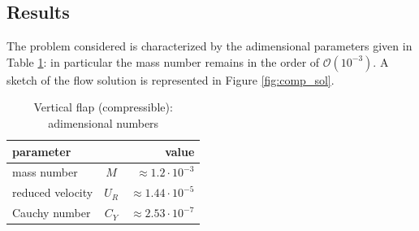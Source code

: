 \subsection{Results}

The problem considered is characterized by the adimensional parameters given in Table \ref{table:comp-adim}: in particular the mass number remains in the order of $\mathcal{O} \left(10^{-3}\right)$. A sketch of the flow solution is represented in Figure \ref{fig:comp_sol}.

\begin{table}[!htb]
	\begin{center}
		\begin{tabular}{ l c | r } 
			parameter & & value   \\ 
			\hline
			mass number  & $M$ & $ \approx 1.2\cdot 10^{-3}$     \\
			reduced velocity & $U_R$ & $ \approx 1.44\cdot 10^{-5}$  \\
			Cauchy number  & $C_Y$ & $  \approx 2.53 \cdot 10^{-7}$  \\			
		\end{tabular}
	\end{center}
	\caption{Vertical flap (compressible): adimensional numbers}
	\label{table:comp-adim}
\end{table}

